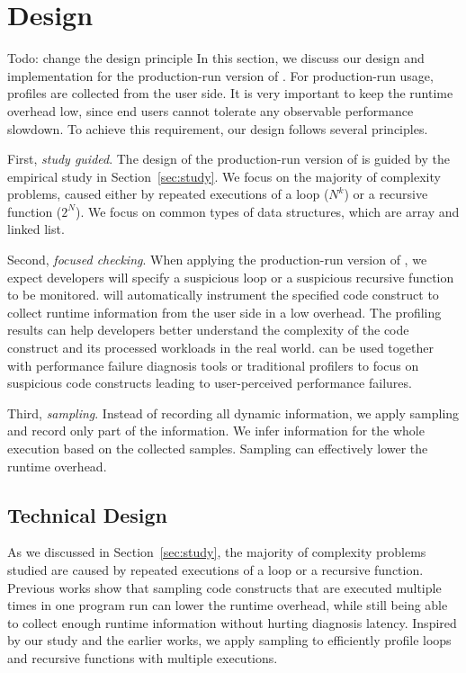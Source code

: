 \section{\Tool Design}
\label{sec:online}


{\color{red} Todo: change the design principle}
In this section, we discuss our design and 
implementation for the production-run version of \Tool. 
For production-run usage, profiles are collected from the user side.
It is very important to keep the runtime overhead low, since
end users cannot tolerate any observable performance slowdown.
To achieve this requirement,
our design follows several principles. 

First, \textit{study guided}. 
The design of the production-run version of \Tool
is guided by the empirical study in Section~\ref{sec:study}.
We focus on the majority of complexity problems, 
caused either by repeated executions of a loop ($N^k$)
or a recursive function ($2^N$).
We focus on common types of data structures, which are array and linked list.

Second, \textit{focused checking}.
When applying the production-run version of \Tool, 
we expect developers will specify a suspicious loop or a suspicious recursive function
to be monitored. 
\Tool will automatically instrument the specified code construct 
to collect runtime information from the user side in a low overhead. 
The profiling results can help developers better understand the complexity of the code construct 
and its processed workloads in the real world.
\Tool can be used together with performance failure 
diagnosis tools\cite{SongOOPSLA2014} 
or traditional profilers to
focus on suspicious code constructs leading 
to user-perceived performance failures.

Third, \textit{sampling}.
Instead of recording all dynamic information, 
we apply sampling and record only part of the information. 
We infer information for the whole execution based on the collected samples. 
Sampling can effectively lower the runtime overhead. 


\subsection{Technical Design}
As we discussed in Section~\ref{sec:study}, 
the majority of complexity problems studied are caused 
by repeated executions of a loop or a recursive function. 
Previous works show that sampling code constructs that are executed 
multiple times in one program run can lower the runtime overhead, 
while still being able to collect enough runtime information 
without hurting diagnosis latency\cite{SongOOPSLA2014,ldoctor}. 
Inspired by our study and the earlier works, 
we apply sampling to efficiently profile loops 
and recursive functions with multiple executions. 

